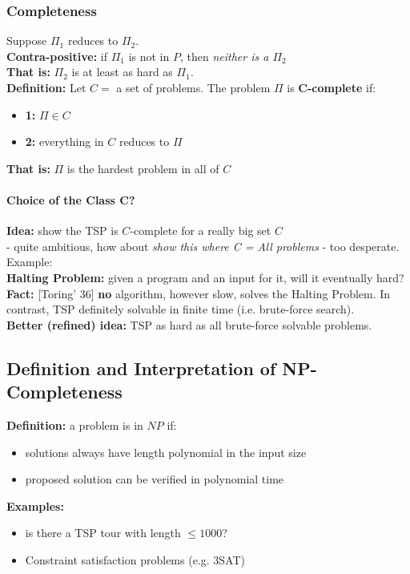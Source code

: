 \documentclass{scrartcl}
\begin{document}
\subsubsection{Completeness}
\label{sec:16-2-1}
Suppose $\Pi_1$ reduces to $\Pi_2$. \\
{\bf Contra-positive: } if $\Pi_1$ is not in $P$, then {\it neither is a
  $\Pi_2$}\\
{\bf That is: } $\Pi_2$ is at least as hard as $\Pi_1$.\\
{\bf Definition: } Let $C = $ a set of problems. The problem $\Pi$ is {\bf
  C-complete } if:
\begin{itemize}
\item {\bf 1: }  $\Pi \in C$
\item {\bf 2: } everything in $C$ reduces to $\Pi$
\end{itemize}
{\bf That is: } $\Pi$ is the hardest problem in all of $C$

\paragraph{Choice of the Class C?}

{\bf Idea: } show the TSP is $C$-complete for a really big set $C$\\
- quite ambitious, how about {\it show this where C = All problems} - too
desperate. Example:\\
{\bf Halting Problem: } given a program and an input for it, will it eventually
hard? \\
{\bf Fact: } [Toring' 36] {\bf no } algorithm, however slow, solves the Halting
Problem. In contrast, TSP definitely solvable in finite time (i.e. brute-force
search). \\
{\bf Better (refined) idea: } TSP as hard as all brute-force solvable problems. 

\subsection{Definition and Interpretation of NP-Completeness}
\label{sec:16-3}
{\bf Definition: } a problem is in $NP$ if:
\begin{itemize}
\item solutions always have length polynomial in the input size
\item proposed solution can be verified in polynomial time
\end{itemize}
{\bf Examples: }
\begin{itemize}
\item is there a TSP tour with length $\leq 1000$?
\item Constraint satisfaction problems (e.g. 3SAT)
\end{itemize}
\end{document}
